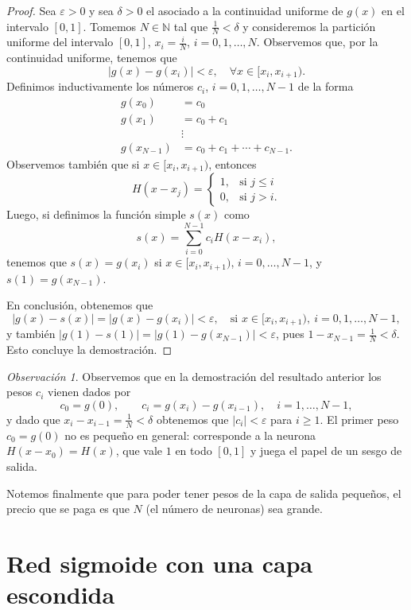 \documentclass[12pt, a4paper]{amsbook}
\newcommand{\ve}{\varepsilon}
\newcommand{\N}{{\mathbb N}}
\theoremstyle{remark}
\newtheorem{obs}[teo]{Observaci\'on}
\theoremstyle{definition}
\numberwithin{section}{chapter}
\numberwithin{subsection}{section}
\numberwithin{equation}{section}
\numberwithin{figure}{chapter}
\begin{document}
\begin{proof}
Sea $\ve>0$ y sea $\delta>0$ el asociado a la continuidad uniforme de $g(x)$ en el intervalo $[0, 1]$. Tomemos $N\in\N$ tal que $\frac{1}{N}<\delta$ y consideremos la partición uniforme del intervalo $[0, 1]$, $x_i = \frac{i}{N}$, $i=0, 1,\dots, N$. Observemos que, por la continuidad uniforme, tenemos que
$$
|g(x)-g(x_i)|<\ve,\quad \forall x\in [x_i, x_{i+1}).
$$
Definimos inductivamente los números $c_i$, $i=0, 1, \dots, N-1$ de la forma
\begin{align*}
g(x_0) &= c_0\\
g(x_1) &= c_0+c_1\\
&\vdots\\
g(x_{N-1})&= c_0+c_1+\cdots+c_{N-1}.
\end{align*}
Observemos también que si $x\in [x_i, x_{i+1})$, entonces
$$
H(x-x_j) = \begin{cases}
1, & \text{si } j\le i\\
0, & \text{si } j>i.
\end{cases}
$$
Luego, si definimos la función simple $s(x)$ como
$$
s(x) = \sum_{i=0}^{N-1} c_i H(x-x_i),
$$
tenemos que $s(x) = g(x_i)$ si $x\in [x_i, x_{i+1})$, $i=0,\dots,N-1$, y $s(1)=g(x_{N-1})$.

En conclusión, obtenemos que
$$
|g(x)-s(x)| = |g(x)-g(x_i)| < \ve, \quad \text{si } x\in [x_i, x_{i+1}),\ i=0,1,\dots,N-1,
$$
y también $|g(1)-s(1)|=|g(1)-g(x_{N-1})|<\ve$, pues $1-x_{N-1}=\frac1N<\delta$. Esto concluye la demostración.
\end{proof}

\begin{obs}\label{obs.perceptron}
Observemos que en la demostración del resultado anterior los pesos $c_i$ vienen dados por
$$
c_0=g(0),\qquad c_i = g(x_i)-g(x_{i-1}),\quad i=1,\dots,N-1,
$$
y dado que $x_i-x_{i-1} = \frac{1}{N} < \delta$ obtenemos que $|c_i|<\ve$ para $i\ge1$. El primer peso $c_0=g(0)$ no es pequeño en general: corresponde a la neurona $H(x-x_0)=H(x)$, que vale $1$ en todo $[0,1]$ y juega el papel de un sesgo de salida.

Notemos finalmente que para poder tener pesos de la capa de salida pequeños, el precio que se paga es que $N$ (el número de neuronas) sea grande.
\end{obs}

\section{Red sigmoide con una capa escondida}\label{sec.c8.3}
\end{document}
